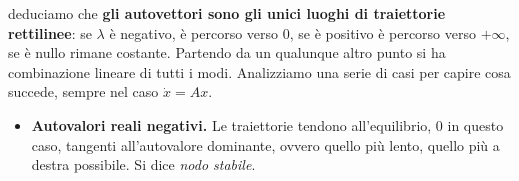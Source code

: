 \documentclass[10pt,a4paper]{book}
\begin{document}
deduciamo che \textbf{gli autovettori sono gli unici luoghi di traiettorie rettilinee}: se $\lambda $ è negativo, è percorso verso $0$, se è positivo è percorso verso $+\infty $, se è nullo rimane costante. Partendo da un qualunque altro punto si ha combinazione lineare di tutti i modi. Analizziamo una serie di casi per capire cosa succede, sempre nel caso $\dot{x} =Ax$.
\begin{itemize}
	\item \textbf{Autovalori reali negativi.} Le traiettorie tendono all'equilibrio, $0$ in questo caso, tangenti all'autovalore dominante, ovvero quello più lento, quello più a destra possibile. Si dice \textit{nodo stabile}.
	      
	      \begin{figure}[htpb]\centering
	      	
	      	\begin{tikzpicture}[x=0.75pt,y=0.75pt,yscale=-1,xscale=1]
	      		

\end{tikzpicture}
\end{figure}
\end{itemize}
\end{document}
